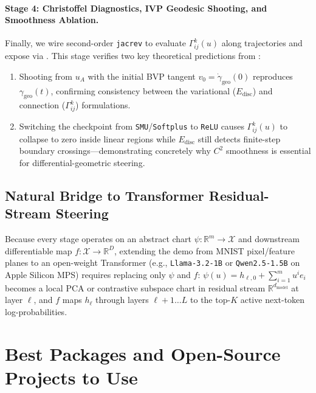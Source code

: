 \documentclass[11pt,a4paper]{article}
\newcommand{\R}{\mathbb{R}}
\theoremstyle{definition}
\begin{document}
\paragraph{Stage 4: Christoffel Diagnostics, IVP Geodesic Shooting, and Smoothness Ablation.}
Finally, we wire second-order \texttt{jacrev} to evaluate $\Gamma^k_{ij}(u)$ along trajectories and expose  via . This stage verifies two key theoretical predictions from :
\begin{enumerate}[leftmargin=*]
    \item Shooting from $u_A$ with the initial BVP tangent $v_0 = \dot{\gamma}_{\mathrm{geo}}(0)$ reproduces $\gamma_{\mathrm{geo}}(t)$, confirming consistency between the variational ($E_{\mathrm{disc}}$) and connection ($\Gamma^k_{ij}$) formulations.
    \item Switching the checkpoint from \texttt{SMU}/\texttt{Softplus} to \texttt{ReLU} causes $\Gamma^k_{ij}(u)$ to collapse to zero inside linear regions while $E_{\mathrm{disc}}$ still detects finite-step boundary crossings---demonstrating concretely why $C^2$ smoothness is essential for differential-geometric steering.
\end{enumerate}

\subsection{Natural Bridge to Transformer Residual-Stream Steering}

Because every stage operates on an abstract chart $\psi : \R^m \to \mathcal{X}$ and downstream differentiable map $f : \mathcal{X} \to \R^D$, extending the demo from MNIST pixel/feature planes to an open-weight Transformer (e.g., \texttt{Llama-3.2-1B} or \texttt{Qwen2.5-1.5B} on Apple Silicon MPS) requires replacing only $\psi$ and $f$: $\psi(u) = h_{\ell,0} + \sum_{i=1}^m u^i e_i$ becomes a local PCA or contrastive subspace chart in residual stream $\R^{d_{\mathrm{model}}}$ at layer $\ell$, and $f$ maps $h_\ell$ through layers $\ell+1 \dots L$ to the top-$K$ active next-token log-probabilities.

\section{Best Packages and Open-Source Projects to Use}
\label{sec:packages-and-projects}
\end{document}
